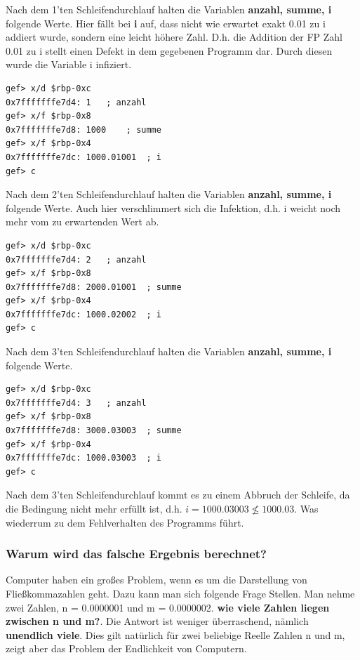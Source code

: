 \documentclass[12pt]{article}
\begin{document}
Nach dem 1'ten Schleifendurchlauf halten die Variablen \textbf{anzahl, summe, i} folgende Werte. Hier fällt bei \textbf{i} auf, dass nicht wie erwartet exakt 0.01 zu i addiert wurde, sondern eine leicht höhere Zahl. D.h. die Addition der FP Zahl 0.01 zu i stellt einen Defekt in dem gegebenen Programm dar. Durch diesen wurde die Variable i infiziert.

\begin{lstlisting}
gef> x/d $rbp-0xc
0x7fffffffe7d4:	1	; anzahl
gef> x/f $rbp-0x8
0x7fffffffe7d8:	1000	; summe
gef> x/f $rbp-0x4
0x7fffffffe7dc:	1000.01001	; i
gef> c
\end{lstlisting}

Nach dem 2'ten Schleifendurchlauf halten die Variablen \textbf{anzahl, summe, i} folgende Werte. Auch hier verschlimmert sich die Infektion, d.h. i weicht noch mehr vom zu erwartenden Wert ab.

\begin{lstlisting}
gef> x/d $rbp-0xc
0x7fffffffe7d4:	2	; anzahl
gef> x/f $rbp-0x8
0x7fffffffe7d8:	2000.01001	; summe
gef> x/f $rbp-0x4
0x7fffffffe7dc:	1000.02002	; i
gef> c
\end{lstlisting}

Nach dem 3'ten Schleifendurchlauf halten die Variablen \textbf{anzahl, summe, i} folgende Werte.

\begin{lstlisting}
gef> x/d $rbp-0xc
0x7fffffffe7d4:	3	; anzahl
gef> x/f $rbp-0x8
0x7fffffffe7d8:	3000.03003	; summe
gef> x/f $rbp-0x4
0x7fffffffe7dc:	1000.03003	; i
gef> c
\end{lstlisting}

Nach dem 3'ten Schleifendurchlauf kommt es zu einem Abbruch der Schleife, da die Bedingung nicht mehr erfüllt ist, d.h. $ i = 1000.03003 \nleq 1000.03 $. Was wiederrum zu dem Fehlverhalten des Programms führt.

\subsubsection{Warum wird das falsche Ergebnis berechnet?}
Computer haben ein großes Problem, wenn es um die Darstellung von Fließkommazahlen geht. Dazu kann man sich folgende Frage Stellen. Man nehme zwei Zahlen, n = 0.0000001 und m = 0.0000002. \textbf{wie viele Zahlen liegen zwischen n und m?}. Die Antwort ist weniger überraschend, nämlich \textbf{unendlich viele}. Dies gilt natürlich für zwei beliebige Reelle Zahlen n und m, zeigt aber das Problem der Endlichkeit von Computern. 
\end{document}
